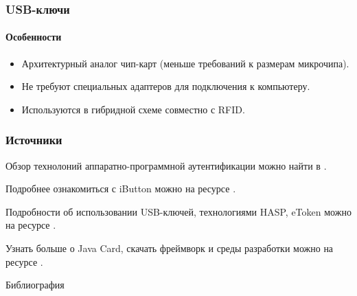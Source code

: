 \begin{frame}
\frametitle{USB-ключи}
\framesubtitle{Особенности}
\begin{itemize}
    \item Архитектурный аналог чип-карт (меньше требований к размерам микрочипа).
    \item Не требуют специальных адаптеров для подключения к компьютеру.
    \item Используются в гибридной схеме совместно с RFID.
\end{itemize}
\end{frame}


\appendix %


\begin{frame}
    \frametitle{Источники}
    Обзор технолоний аппаратно-программной аутентификации можно найти в \cite{bib:shangin:protect,bib:djhuian:eid}.

    Подробнее ознакомиться с iButton можно на ресурсе \cite{bib:misc:ibutton}.

    Подробности об использовании USB-ключей, технологиями HASP, eToken можно на ресурсе \cite{bib:misc:aladdin}.

    Узнать больше о Java Card, скачать фреймворк и среды разработки можно на ресурсе \cite{bib:misc:oracle}.
\end{frame}


\begin{frame}[allowframebreaks]{Библиография}
    
    
\end{frame}

